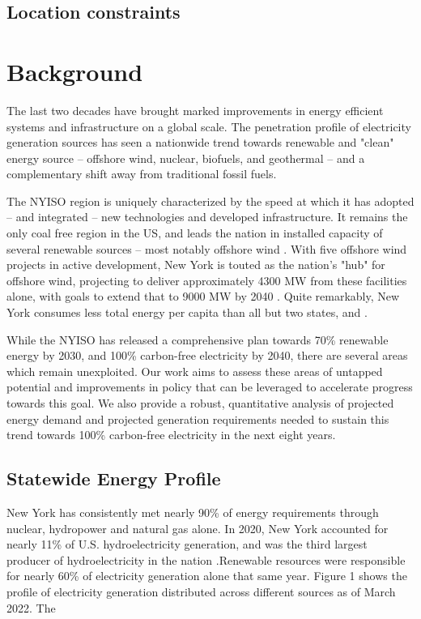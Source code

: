 \documentclass[plain]{article}
\newcommand{\1}{\mathbbm{1}}
\begin{document}
\subsection{Location constraints}
\section{Background}
The last two decades have brought marked improvements in energy efficient systems and infrastructure on a global scale. The penetration profile of electricity generation sources has seen a nationwide trend towards renewable and "clean" energy source -- offshore wind, nuclear, biofuels, and geothermal -- and a complementary shift away from traditional fossil fuels. 

The NYISO region is uniquely characterized by the speed at which it has adopted -- and integrated -- new technologies and developed infrastructure. It remains the only coal free region in the US, and leads the nation in installed capacity of several renewable sources -- most notably offshore wind \cite{noauthor_new_nodate-1} . With five offshore wind projects in active development, New York is touted as the nation's "hub" for offshore wind, projecting to deliver approximately 4300 MW from these facilities alone, with goals to extend that to 9000 MW by 2040 . Quite remarkably, New York consumes less total energy per capita than all but two states, and .

While the NYISO has released a comprehensive plan towards 70\% renewable energy by 2030, and 100\% carbon-free electricity by 2040, 
there are several areas which remain unexploited. Our work aims to assess these areas of untapped potential and improvements in policy that can be leveraged to accelerate progress towards this goal. We also provide a robust, quantitative analysis of projected energy demand and projected generation requirements needed to sustain this trend towards 100\% carbon-free electricity in the next eight years.

\subsection{Statewide Energy Profile}
New York has consistently met nearly 90\% of energy requirements through nuclear, hydropower and natural gas alone. In 2020, New York accounted for nearly 11\% of U.S. hydroelectricity generation, and was the third largest producer of hydroelectricity in the nation .Renewable resources were responsible for nearly 60\% of electricity generation alone that same year. Figure 1 shows the profile of electricity generation distributed across different sources as of March 2022. The 
\end{document}
